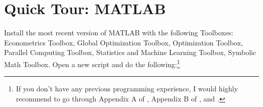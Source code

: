 \section[Quick Tour: MATLAB]{Quick Tour: MATLAB\label{ex:QuickTourMATLAB}}
Install the most recent version of MATLAB with the following Toolboxes:
  Econometrics Toolbox,
  Global Optimization Toolbox,
  Optimization Toolbox,
  Parallel Computing Toolbox,
  Statistics and Machine Learning Toolbox,
  Symbolic Math Toolbox.
Open a new script and do the following:\footnote{%
  If you don't have any previous programming experience,
  I would highly recommend to go through
  Appendix A of \textcite{Brandimarte_2006_NumericalMethodsFinance},
  Appendix B of \textcite{Miranda.Fackler_2002_AppliedComputationalEconomics},
  and \textcite{Pfeifer_2017_MATLABHandout}.
}

